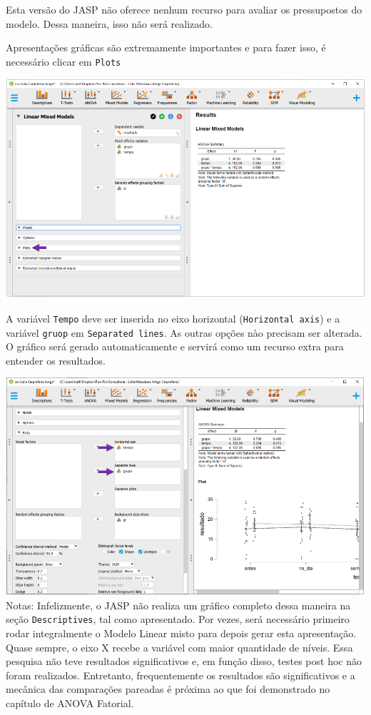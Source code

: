 \documentclass[
]{book}
\begin{document}
Esta versão do JASP não oferece nenhum recurso para avaliar os pressupostos do modelo. Dessa maneira, isso não será realizado.

Apresentações gráficas são extremamente importantes e para fazer isso, é necessário clicar em \texttt{Plots}

\includegraphics{./img/cap_lmm_resultados_plots.png}

A variável \texttt{Tempo} deve ser inserida no eixo horizontal (\texttt{Horizontal\ axis}) e a variável \texttt{gruop} em \texttt{Separated\ lines}. As outras opções nào precisam ser alterada. O gráfico será gerado automaticamente e servirá como um recurso extra para entender os resultados.

\includegraphics{./img/cap_lmm_resultados_plots2.png}
Notas: Infelizmente, o JASP não realiza um gráfico completo dessa maneira na seção \texttt{Descriptives}, tal como apresentado. Por vezes, será necessário primeiro rodar integralmente o Modelo Linear misto para depois gerar esta apresentação. Quase sempre, o eixo X recebe a variável com maior quantidade de níveis. Essa pesquisa não teve resultados significativos e, em função disso, testes post hoc não foram realizados. Entretanto, frequentemente os resultados são significativos e a mecânica das comparações pareadas é próxima ao que foi demonstrado no capítulo de ANOVA Fatorial.
\end{document}
